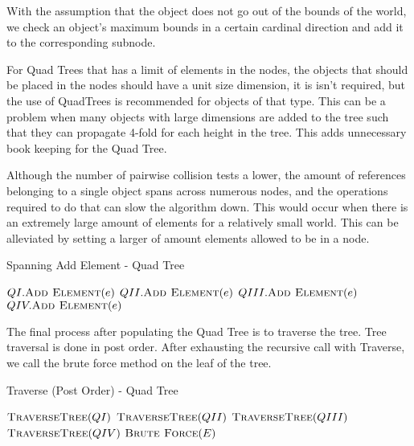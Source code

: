 \documentclass[conference]{IEEEtran}
\begin{document}
With the assumption that the object does not go out of the bounds of the world, we check an object's maximum bounds in a certain cardinal direction and add it to the corresponding subnode.

For Quad Trees that has a limit of elements in the nodes, the objects that should be placed in the nodes should have a unit size dimension, it is isn't required, but the use of QuadTrees is recommended for objects of that type. This can be a problem when many objects with large dimensions are added to the tree such that they can propagate 4-fold for each height in the tree. This adds unnecessary book keeping for the Quad Tree.

Although the number of pairwise collision tests a lower, the amount of references belonging to a single object spans across numerous nodes, and the operations required to do that can slow the algorithm down. This would occur when there is an extremely large amount of elements for a relatively small world. This can be alleviated by setting a larger of amount elements allowed to be in a node.

\begin{algorithm}
\caption{Spanning Add Element - Quad Tree}
\begin{algorithmic}[1]
		\State $QI.\Call{Add Element}{e}$
	\EndIf
		\State $QII.\Call{Add Element}{e}$
	\EndIf
		\State $QIII.\Call{Add Element}{e}$
	\EndIf
		\State $QIV.\Call{Add Element}{e}$
	\EndIf
\EndFunction
\end{algorithmic}
\end{algorithm}

The final process after populating the Quad Tree is to traverse the tree. Tree traversal is done in post order. After exhausting the recursive call with Traverse, we call the brute force method on the leaf of the tree.

\begin{algorithm}
\caption{Traverse (Post Order) - Quad Tree}
\begin{algorithmic}[1]
		\State $\Call{TraverseTree}{QI}$
	\EndIf
		\State $\Call{TraverseTree}{QII}$
	\EndIf
		\State $\Call{TraverseTree}{QIII}$
	\EndIf
		\State $\Call{TraverseTree}{QIV}$
	\EndIf
	\State $\Call{Brute Force}{E}$
\EndFunction
\end{algorithmic}
\end{algorithm}
\end{document}
